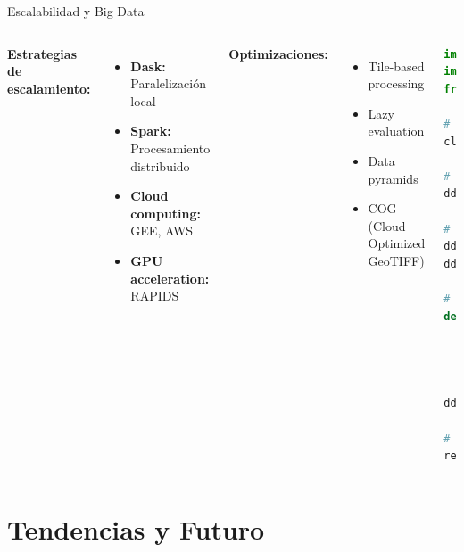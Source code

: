 \documentclass[10pt,aspectratio=169]{beamer}
\begin{document}
\begin{frame}{Escalabilidad y Big Data}
    \begin{columns}
        \textbf{Estrategias de escalamiento:}
        \begin{itemize}
            \item \textbf{Dask:} Paralelización local
            \item \textbf{Spark:} Procesamiento distribuido
            \item \textbf{Cloud computing:} GEE, AWS
            \item \textbf{GPU acceleration:} RAPIDS
        \end{itemize}

        \vspace{3mm}
        \textbf{Optimizaciones:}
        \begin{itemize}
            \item Tile-based processing
            \item Lazy evaluation
            \item Data pyramids
            \item COG (Cloud Optimized GeoTIFF)
        \end{itemize}

        \begin{lstlisting}[language=Python,basicstyle=\tiny]
import dask.dataframe as dd
import dask_geopandas as dgpd
from dask.distributed import Client

# Cliente Dask distribuido
client = Client('scheduler-address:8786')

# GeoDataFrame distribuido
ddf = dgpd.read_parquet('geodata/*.parquet')

# Operaciones lazy
ddf['buffer_1km'] = ddf.geometry.buffer(1000)
ddf['area'] = ddf.buffer_1km.area

# Feature engineering paralelo
def compute_spatial_features(partition):
    # Operaciones por partición
    partition['neighbor_count'] = ...
    return partition

ddf = ddf.map_partitions(compute_spatial_features)

# Computar cuando sea necesario
result = ddf.compute()
        \end{lstlisting}
    \end{columns}
\end{frame}

\section{Tendencias y Futuro}
\end{document}
